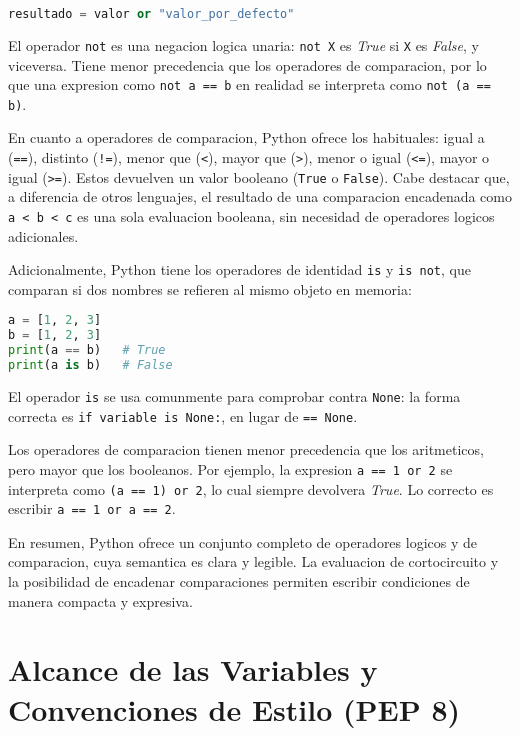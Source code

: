 \begin{lstlisting}[language=Python, caption={Uso de or como valor por defecto}]
resultado = valor or "valor_por_defecto"
\end{lstlisting}

El operador \texttt{not} es una negacion logica unaria: \texttt{not X} es \textit{True} si \texttt{X} es \textit{False}, y viceversa. Tiene menor precedencia que los operadores de comparacion, por lo que una expresion como \texttt{not a == b} en realidad se interpreta como \texttt{not (a == b)}.

En cuanto a operadores de comparacion, Python ofrece los habituales: igual a (\texttt{==}), distinto (\texttt{!=}), menor que (\texttt{<}), mayor que (\texttt{>}), menor o igual (\texttt{<=}), mayor o igual (\texttt{>=}). Estos devuelven un valor booleano (\texttt{True} o \texttt{False}). Cabe destacar que, a diferencia de otros lenguajes, el resultado de una comparacion encadenada como \texttt{a < b < c} es una sola evaluacion booleana, sin necesidad de operadores logicos adicionales.

Adicionalmente, Python tiene los operadores de identidad \texttt{is} y \texttt{is not}, que comparan si dos nombres se refieren al mismo objeto en memoria:

\begin{lstlisting}[language=Python, caption={Comparacion de identidades}]
a = [1, 2, 3]
b = [1, 2, 3]
print(a == b)   # True
print(a is b)   # False
\end{lstlisting}

El operador \texttt{is} se usa comunmente para comprobar contra \texttt{None}: la forma correcta es \texttt{if variable is None:}, en lugar de \texttt{== None}.

Los operadores de comparacion tienen menor precedencia que los aritmeticos, pero mayor que los booleanos. Por ejemplo, la expresion \texttt{a == 1 or 2} se interpreta como \texttt{(a == 1) or 2}, lo cual siempre devolvera \textit{True}. Lo correcto es escribir \texttt{a == 1 or a == 2}.

En resumen, Python ofrece un conjunto completo de operadores logicos y de comparacion, cuya semantica es clara y legible. La evaluacion de cortocircuito y la posibilidad de encadenar comparaciones permiten escribir condiciones de manera compacta y expresiva.

\section{Alcance de las Variables y Convenciones de Estilo (PEP 8)}

